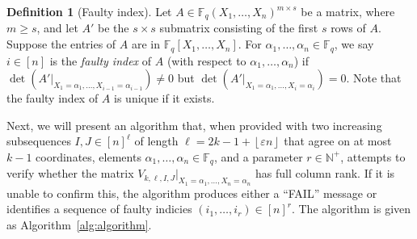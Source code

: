 \documentclass[11pt]{article}
\theoremstyle{plain}
\theoremstyle{definition}
\newtheorem{defn}[thm]{Definition}
\theoremstyle{remark}
\newcommand{\F}{\mathbb{F}}
\newcommand{\floor}[1]{\left\lfloor #1 \right\rfloor}
\begin{document}
\begin{defn}[Faulty index]\label{defn:faulty}
Let $A\in\F_q(X_1,\dots,X_n)^{m\times s}$ be a matrix, where $m\ge s$, and let $A'$ be the $s\times s$ submatrix consisting of the first $s$ rows of $A$. Suppose the entries of $A$ are in $\F_q[X_1,\dots,X_n]$.
For $\alpha_1,\dots,\alpha_n\in \F_q$, we say $i\in [n]$ is the \emph{faulty index} of $A$ (with respect to $\alpha_1,\dots,\alpha_n$) if   $\det(A'|_{X_1=\alpha_1,\dots,X_{i-1}=\alpha_{i-1}})\neq 0$ but $\det(A'|_{X_1=\alpha_1,\dots,X_{i}=\alpha_{i}})= 0$. Note that the faulty index of $A$ is unique if it exists. 
\end{defn}
Next, we will present an algorithm that, when provided with two increasing subsequences $I,J\in[n]^{\ell}$ of length $\ell=2k-1+\floor{\varepsilon n}$ that agree on at most $k-1$ coordinates, elements $\alpha_1,\dots,\alpha_n\in\F_q$, and a parameter $r\in\mathbb{N}^+$, attempts to verify whether the matrix $V_{k,\ell,I,J}|_{X_1=\alpha_1,\dots,X_n=\alpha_n}$ has full column rank. If it is unable to confirm this, the algorithm produces either a ``FAIL'' message or identifies a sequence of faulty indicies $(i_1,\dots,i_r)\in [n]^r$. 
The algorithm is given as  Algorithm~\ref{alg:algorithm}.
\end{document}

